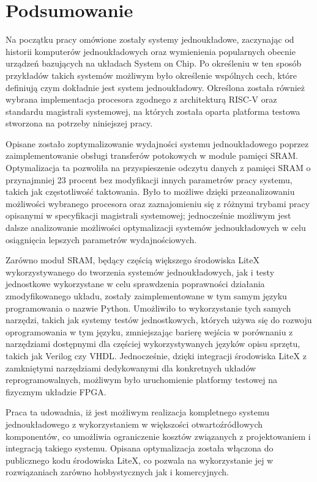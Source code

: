 \section{Podsumowanie}

Na początku pracy omówione zostały systemy jednoukładowe, zaczynając od historii komputerów jednoukładowych oraz wymienienia popularnych obecnie urządzeń bazujących na układach System on Chip. Po określeniu w ten sposób przykładów takich systemów możliwym było określenie wspólnych cech, które definiują czym dokładnie jest system jednoukładowy. Określona została również wybrana implementacja procesora zgodnego z architekturą RISC-V oraz standardu magistrali systemowej, na których została oparta platforma testowa stworzona na potrzeby niniejszej pracy.

Opisane zostało zoptymalizowanie wydajności systemu jednoukładowego poprzez zaimplementowanie obsługi transferów potokowych w module pamięci SRAM. Optymalizacja ta pozwoliła na przyspieszenie odczytu danych z pamięci SRAM o przynajmniej 23 procent bez modyfikacji innych parametrów pracy systemu, takich jak częstotliwość taktowania. Było to możliwe dzięki przeanalizowaniu możliwości wybranego procesora oraz zaznajomieniu się z różnymi trybami pracy opisanymi w specyfikacji magistrali systemowej; jednocześnie możliwym jest dalsze analizowanie możliwości optymalizacji systemów jednoukładowych w celu osiągnięcia lepszych parametrów wydajnościowych.

Zarówno moduł SRAM, będący częścią większego środowiska LiteX wykorzystywanego do tworzenia systemów jednoukładowych, jak i testy jednostkowe wykorzystane w celu sprawdzenia poprawności działania zmodyfikowanego układu, zostały zaimplementowane w tym samym języku programowania o nazwie Python. Umożliwiło to wykorzystanie tych samych narzędzi, takich jak systemy testów jednostkowych, których używa się do rozwoju oprogramowania w tym języku, zmniejszając barierę wejścia w porównaniu z narzędziami dostępnymi dla częściej wykorzystywanych języków opisu sprzętu, takich jak Verilog czy VHDL. Jednocześnie, dzięki integracji środowiska LiteX z zamkniętymi narzędziami dedykowanymi dla konkretnych układów reprogramowalnych, możliwym było uruchomienie platformy testowej na fizycznym układzie FPGA.

Praca ta udowadnia, iż jest możliwym realizacja kompletnego systemu jednoukładowego z wykorzystaniem w większości otwartoźródłowych komponentów, co umożliwia ograniczenie kosztów związanych z projektowaniem i integracją takiego systemu. Opisana optymalizacja została włączona do publicznego kodu środowiska LiteX, co pozwala na wykorzystanie jej w rozwiązaniach zarówno hobbystycznych jak i komercyjnych.
